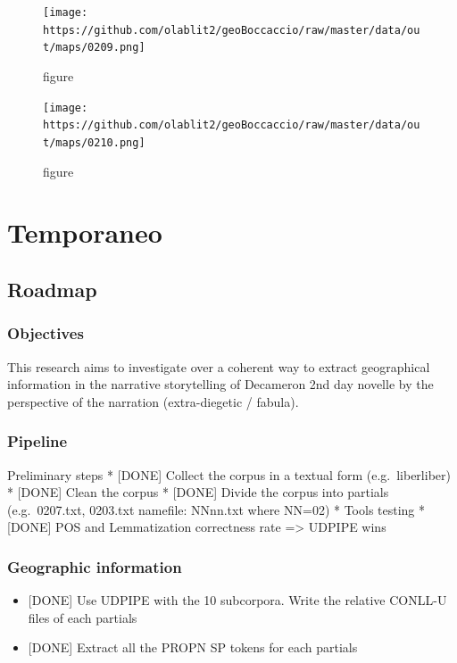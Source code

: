 \begin{figure}
\centering
\texttt{[image: https://github.com/olablit2/geoBoccaccio/raw/master/data/out/maps/0209.png]}
\caption{figure}
\end{figure}

\begin{figure}
\centering
\texttt{[image: https://github.com/olablit2/geoBoccaccio/raw/master/data/out/maps/0210.png]}
\caption{figure}
\end{figure}

\section{Temporaneo}\label{temporaneo}

\subsection{Roadmap}\label{roadmap}

\subsubsection{Objectives}\label{objectives}

This research aims to investigate over a coherent way to extract
geographical information in the narrative storytelling of Decameron 2nd
day novelle by the perspective of the narration (extra-diegetic /
fabula).

\subsubsection{Pipeline}\label{pipeline}

Preliminary steps * {[}DONE{]} Collect the corpus in a textual form
(e.g.~liberliber) * {[}DONE{]} Clean the corpus * {[}DONE{]} Divide the
corpus into partials (e.g.~0207.txt, 0203.txt \textbar{} namefile:
NNnn.txt where NN=02) * Tools testing * {[}DONE{]} POS and Lemmatization
correctness rate =\textgreater{} UDPIPE wins

\subsubsection{Geographic information}\label{geographic-information}

\begin{itemize}
\tightlist
\item
  {[}DONE{]} Use UDPIPE with the 10 subcorpora. Write the relative
  CONLL-U files of each partials
\item
  {[}DONE{]} Extract all the PROPN \textbar{} SP tokens for each
  partials
\end{itemize}

